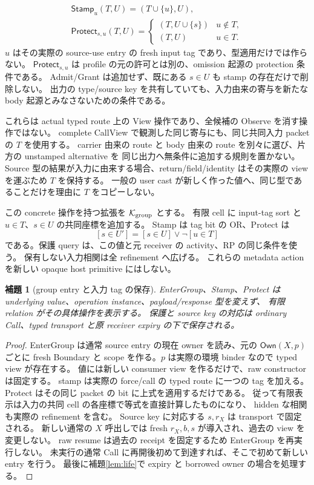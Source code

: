 \documentclass[11pt,a4paper]{article}
\newtheorem{lemma}[definition]{補題}
\newcommand{\Core}{\mathcal K}
\begin{document}
\[
\begin{array}{l}
 \mathsf{Stamp}_u(T,U)=(T\cup\{u\},U),\\
 \mathsf{Protect}_{s,u}(T,U)=
 \begin{cases}(T,U\cup\{s\})&u\notin T,\\(T,U)&u\in T.\end{cases}
\end{array}
 \tag{N-Transfer}
\]
\(u\) はその実際の source-use entry の fresh input tag であり、型適用だけでは作らない。
\(\mathsf{Protect}_{s,u}\) は profile の元の許可とは別の、omission 起源の protection 条件である。
Admit/Grant は追加せず、既にある \(s\in U\) も stamp の存在だけで削除しない。
出力の type/source key を共有していても、入力由来の寄与を新たな body 起源とみなさないための条件である。

これらは actual typed route 上の View 操作であり、全候補の Observe を消す操作ではない。
complete CallView で観測した同じ寄与にも、同じ共同入力 packet の \(T\) を使用する。
carrier 由来の route と body 由来の route を別々に選び、片方の unstamped alternative を
同じ出力へ無条件に追加する規則を置かない。
Source 型の結果が入力に由来する場合、return/field/identity はその実際の view を運ぶため \(T\) を保持する。
一般の user cast が新しく作った値へ、同じ型であることだけを理由に \(T\) をコピーしない。

この concrete 操作を持つ拡張を \(\Core_{\rm group}\) とする。
有限 cell に input-tag sort と \(u\in T\)、\(s\in U\) の共同座標を追加する。
Stamp は tag bit の OR、Protect は
\[
 [s\in U']=[s\in U]\lor\neg[u\in T]
\]
である。保護 query は、この値と元 receiver の activity、RP の同じ条件を使う。
保有しない入力相関は全 refinement へ広げる。
これらの metadata action を新しい opaque host primitive にはしない。

\begin{lemma}[group entry と入力 tag の保存]
\label{lem:group-transfer}
EnterGroup、Stamp、Protect は underlying value、operation instance、payload/response 型を変えず、
有限 relation がその具体操作を表示する。
保護と source key の対応は ordinary Call、typed transport と原 receiver expiry の下で保存される。
\end{lemma}
\begin{proof}
EnterGroup は通常 source entry の現在 owner を読み、元の \(\mathsf{Own}(X,p)\) ごとに
fresh Boundary と scope を作る。\(p\) は実際の環境 binder なので typed view が存在する。
値には新しい consumer view を作るだけで、raw constructor は固定する。
stamp は実際の force/call の typed route に一つの tag を加える。
Protect はその同じ packet の bit に上式を適用するだけである。
従って有限表示は入力の共同 cell の各座標で等式を直接計算したものになり、
hidden な相関も実際の refinement を含む。
Source key に対応する \(s,r_X\) は transport で固定される。
新しい通常の \(X\) 呼出しでは fresh \(r_X,b,s\) が導入され、過去の view を変更しない。
raw resume は過去の receipt を固定するため EnterGroup を再実行しない。
未実行の通常 Call に再開後初めて到達すれば、そこで初めて新しい entry を行う。
最後に補題\ref{lem:life}で expiry と borrowed owner の場合を処理する。
\end{proof}
\end{document}
